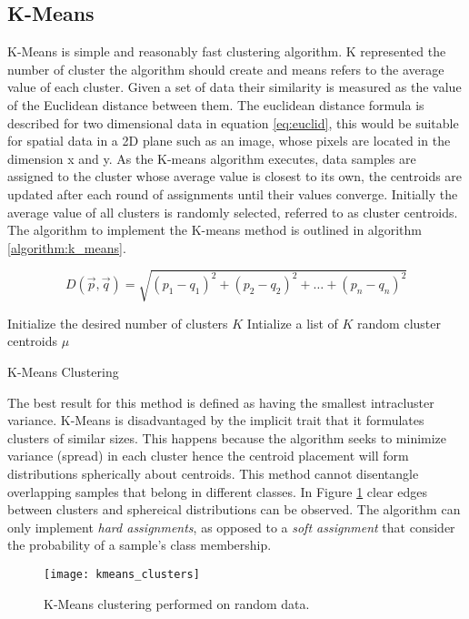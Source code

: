 \subsection{K-Means}
K-Means is simple and reasonably fast clustering algorithm. K represented the number of cluster the algorithm should create and means refers to the average value of each cluster. Given a set of data their similarity is measured as the value of the Euclidean distance between them. The euclidean distance formula is described for two dimensional data in equation \ref{eq:euclid}, this would be suitable for spatial data in a 2D plane such as an image, whose pixels are located in the dimension x and y. As the K-means algorithm executes, data samples are assigned to the cluster whose average value is closest to its own, the centroids are updated after each round of assignments until their values converge. Initially the average value of all clusters is randomly selected, referred to as cluster centroids. The algorithm to implement the K-means method is outlined in algorithm \ref{algorithm:k_means}.

\begin{equation}
    D(\vec{p},\vec{q}) = \sqrt{(p_1 - q_1)^2 + (p_2 - q_2)^2 +\hdots + (p_n - q_n)^2}
    \label{eq:euclid}
\end{equation} 

\begin{algorithm}
    \SetAlgoLined
    Initialize the desired number of clusters $K$\;
    Intialize a list of $K$ random cluster centroids $\mu$\;
    \caption{K-Means Clustering \cite{oreilly_python}}
    \label{algorithm:k_means}
\end{algorithm}

The best result for this method is defined as having the smallest intracluster variance. K-Means is disadvantaged by the implicit trait that it formulates clusters of similar sizes. This happens because the algorithm seeks to minimize variance (spread) in each cluster hence the  centroid placement will form distributions spherically about centroids. This method cannot disentangle overlapping samples that belong in different classes. In Figure \ref{fig:clusters} clear edges between clusters and sphereical distributions can be observed. The algorithm can only implement \emph{hard assignments}, as opposed to a \emph{soft assignment} that consider the probability of a sample's class membership. 



\begin{figure}[H]
    \centering
    \centering\texttt{[image: kmeans\_clusters]}
    \caption{K-Means clustering performed on random data.}
    \label{fig:clusters}
\end{figure} 
